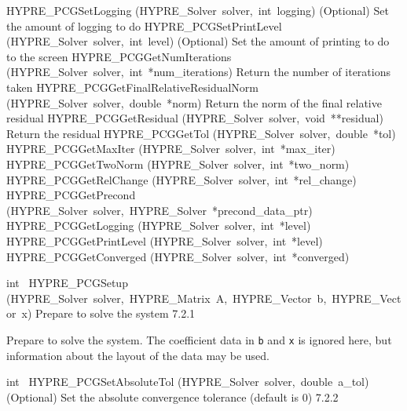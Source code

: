 \documentclass{article}
\begin{document}
\begin{cxxentry}
\begin{cxxentry}
\begin{cxxnames}
        {HYPRE\_PCGSetLogging}
        {(HYPRE\_Solver\ solver,\ int\ logging)}
        {
(Optional) Set the amount of logging to do}
        {}
\label{cxx.7.2.9}
        {HYPRE\_PCGSetPrintLevel}
        {(HYPRE\_Solver\ solver,\ int\ level)}
        {
(Optional) Set the amount of printing to do to the screen}
        {}
\label{cxx.7.2.10}
        {HYPRE\_PCGGetNumIterations}
        {(HYPRE\_Solver\ solver,\ int\ *num\_iterations)}
        {
Return the number of iterations taken}
        {}
\label{cxx.7.2.11}
        {HYPRE\_PCGGetFinalRelativeResidualNorm}
        {(HYPRE\_Solver\ solver,\ double\ *norm)}
        {
Return the norm of the final relative residual}
        {}
\label{cxx.7.2.12}
        {HYPRE\_PCGGetResidual}
        {(HYPRE\_Solver\ solver,\ void\ **residual)}
        {
Return the residual}
        {}
\label{cxx.7.2.13}
        {HYPRE\_PCGGetTol}
        {(HYPRE\_Solver\ solver,\ double\ *tol)}
        {}
        {}
\label{cxx.7.2.14}
        {HYPRE\_PCGGetMaxIter}
        {(HYPRE\_Solver\ solver,\ int\ *max\_iter)}
        {}
        {}
\label{cxx.7.2.15}
        {HYPRE\_PCGGetTwoNorm}
        {(HYPRE\_Solver\ solver,\ int\ *two\_norm)}
        {}
        {}
\label{cxx.7.2.16}
        {HYPRE\_PCGGetRelChange}
        {(HYPRE\_Solver\ solver,\ int\ *rel\_change)}
        {}
        {}
\label{cxx.7.2.17}
        {HYPRE\_PCGGetPrecond}
        {(HYPRE\_Solver\ solver,\ HYPRE\_Solver\ *precond\_data\_ptr)}
        {}
        {}
\label{cxx.7.2.18}
        {HYPRE\_PCGGetLogging}
        {(HYPRE\_Solver\ solver,\ int\ *level)}
        {}
        {}
\label{cxx.7.2.19}
        {HYPRE\_PCGGetPrintLevel}
        {(HYPRE\_Solver\ solver,\ int\ *level)}
        {}
        {}
\label{cxx.7.2.20}
        {HYPRE\_PCGGetConverged}
        {(HYPRE\_Solver\ solver,\ int\ *converged)}
        {}
        {}
\label{cxx.7.2.21}
\end{cxxnames}
\begin{cxxfunction}
{int\ }
        {HYPRE\_PCGSetup}
        {(HYPRE\_Solver\ solver,\ HYPRE\_Matrix\ A,\ HYPRE\_Vector\ b,\ HYPRE\_Vector\ x)}
        {
Prepare to solve the system}
        {7.2.1}
\begin{cxxdoc}

Prepare to solve the system.  The coefficient data in {\tt b} and {\tt x} is
ignored here, but information about the layout of the data may be used.
\end{cxxdoc}
\end{cxxfunction}
\begin{cxxfunction}
{int\ }
        {HYPRE\_PCGSetAbsoluteTol}
        {(HYPRE\_Solver\ solver,\ double\ a\_tol)}
        {
(Optional) Set the absolute convergence tolerance (default is
0)}
        {7.2.2}
\begin{cxxdoc}


\end{cxxdoc}
\end{cxxfunction}
\end{cxxentry}
\end{cxxentry}
\end{document}

